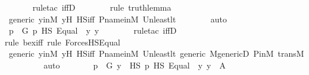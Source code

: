 \begin{isabellebody}
\ \ \ \ \ \ \isamarkupfalse%
{\isacharparenleft}{\kern0pt}rule{\isacharunderscore}{\kern0pt}tac\ iffD{}{\isacharparenright}{\kern0pt}\isanewline
\ \ \ \ \ \ \ \isamarkupfalse%
{\isacharparenleft}{\kern0pt}rule\ truth{\isacharunderscore}{\kern0pt}lemma{\isacharparenright}{\kern0pt}\isanewline
\ \ \ \ \ \ \isamarkupfalse%
\ generic\ y{\isacharprime}{\kern0pt}inM\ y{\isacharprime}{\kern0pt}{\isacharprime}{\kern0pt}H\ HS{\isacharunderscore}{\kern0pt}iff\ P{\isacharunderscore}{\kern0pt}name{\isacharunderscore}{\kern0pt}in{\isacharunderscore}{\kern0pt}M\ Un{\isacharunderscore}{\kern0pt}least{\isacharunderscore}{\kern0pt}lt\isanewline
\ \ \ \ \ \ \isamarkupfalse%
\ auto\isanewline
\ \ \ \ \isamarkupfalse%
\ \isamarkupfalse%
\ {\isachardoublequoteopen}{\isasymexists}p\ {\isasymin}\ G{\isachardot}{\kern0pt}\ p\ {\isasymtturnstile}HS\ Equal{\isacharparenleft}{\kern0pt}{}{\isacharcomma}{\kern0pt}\ {}{\isacharparenright}{\kern0pt}\ {\isacharbrackleft}{\kern0pt}y{\isacharprime}{\kern0pt}{\isacharcomma}{\kern0pt}\ y{\isacharprime}{\kern0pt}{\isacharprime}{\kern0pt}{\isacharbrackright}{\kern0pt}{\isachardoublequoteclose}\ \isanewline
\ \ \ \ \ \ \isamarkupfalse%
{\isacharparenleft}{\kern0pt}rule{\isacharunderscore}{\kern0pt}tac\ iffD{}{\isacharparenright}{\kern0pt}\isanewline
\ \ \ \ \ \ \ \isamarkupfalse%
{\isacharparenleft}{\kern0pt}rule\ bex{\isacharunderscore}{\kern0pt}iff{\isacharcomma}{\kern0pt}\ rule\ ForcesHS{\isacharunderscore}{\kern0pt}Equal{\isacharparenright}{\kern0pt}\isanewline
\ \ \ \ \ \ \isamarkupfalse%
\ generic\ y{\isacharprime}{\kern0pt}inM\ y{\isacharprime}{\kern0pt}{\isacharprime}{\kern0pt}H\ HS{\isacharunderscore}{\kern0pt}iff\ P{\isacharunderscore}{\kern0pt}name{\isacharunderscore}{\kern0pt}in{\isacharunderscore}{\kern0pt}M\ Un{\isacharunderscore}{\kern0pt}least{\isacharunderscore}{\kern0pt}lt\ generic\ M{\isacharunderscore}{\kern0pt}genericD\ P{\isacharunderscore}{\kern0pt}in{\isacharunderscore}{\kern0pt}M\ transM\ \isanewline
\ \ \ \ \ \ \isamarkupfalse%
\ auto\isanewline
\ \ \ \ \isamarkupfalse%
\ \isamarkupfalse%
\ {\isachardoublequoteopen}{\isasymexists}p\ {\isasymin}\ G{\isachardot}{\kern0pt}\ {\isasymexists}y{\isacharprime}{\kern0pt}{\isacharprime}{\kern0pt}\ {\isasymin}\ HS{\isachardot}{\kern0pt}\ p\ {\isasymtturnstile}HS\ Equal{\isacharparenleft}{\kern0pt}{}{\isacharcomma}{\kern0pt}\ {}{\isacharparenright}{\kern0pt}\ {\isacharbrackleft}{\kern0pt}y{\isacharprime}{\kern0pt}{\isacharcomma}{\kern0pt}\ y{\isacharprime}{\kern0pt}{\isacharprime}{\kern0pt}{\isacharbrackright}{\kern0pt}{\isachardoublequoteclose}\ {\isacharparenleft}{\kern0pt}\ {\isacharquery}{\kern0pt}A{\isacharparenright}{\kern0pt}\ \isamarkupfalse%

\end{isabellebody}

